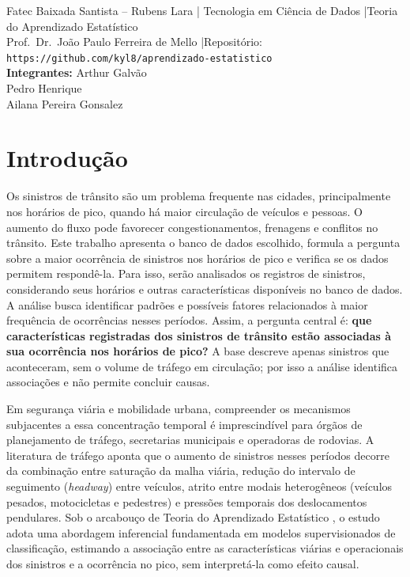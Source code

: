 \documentclass[
  article,
  12pt,
  oneside,
  a4paper,
  english,
  brazil
]{abntex2}\usepackage[]{graphicx}\usepackage[]{xcolor}
\newcommand{\nomecurso}{Tecnologia em Ciência de Dados}
\newcommand{\nomedisciplina}{Teoria do Aprendizado Estatístico}
\newcommand{\nomeprofessor}{Prof.\ Dr.\ João Paulo Ferreira de Mello}
\newcommand{\repositorio}{https://github.com/kyl8/aprendizado-estatistico}
\newcommand{\integrantes}{%
  Arthur Galvão \\
  Pedro Henrique \\
  Ailana Pereira Gonsalez%
}
\begin{document}
\frenchspacing

\maketitle

\begin{center}
  \footnotesize
  Fatec Baixada Santista -- Rubens Lara \quad|\quad
  \nomecurso{} \quad|\quad \nomedisciplina{} \\[0.2em]
  \nomeprofessor{} \quad|\quad Repositório: \texttt{\repositorio} \\[0.2em]
  \textbf{Integrantes:} \integrantes
\end{center}

\textual

\section{Introdução}

Os sinistros de trânsito são um problema frequente nas cidades, principalmente nos horários de pico, quando há maior circulação de veículos e pessoas. O aumento do fluxo pode favorecer congestionamentos, frenagens e conflitos no trânsito. Este trabalho apresenta o banco de dados escolhido, formula a pergunta sobre a maior ocorrência de sinistros nos horários de pico e verifica se os dados permitem respondê-la. Para isso, serão analisados os registros de sinistros, considerando seus horários e outras características disponíveis no banco de dados. A análise busca identificar padrões e possíveis fatores relacionados à maior frequência de ocorrências nesses períodos. Assim, a pergunta central é: \textbf{que características registradas dos sinistros de trânsito estão associadas à sua ocorrência nos horários de pico?} A base descreve apenas sinistros que aconteceram, sem o volume de tráfego em circulação; por isso a análise identifica associações e não permite concluir causas.

Em segurança viária e mobilidade urbana, compreender os mecanismos subjacentes a essa concentração temporal é imprescindível para órgãos de planejamento de tráfego, secretarias municipais e operadoras de rodovias. A literatura de tráfego aponta que o aumento de sinistros nesses períodos decorre da combinação entre saturação da malha viária, redução do intervalo de seguimento (\textit{headway}) entre veículos, atrito entre modais heterogêneos (veículos pesados, motocicletas e pedestres) e pressões temporais dos deslocamentos pendulares. Sob o arcabouço de Teoria do Aprendizado Estatístico \cite{james2021}, o estudo adota uma abordagem inferencial fundamentada em modelos supervisionados de classificação, estimando a associação entre as características viárias e operacionais dos sinistros e a ocorrência no pico, sem interpretá-la como efeito causal.
\end{document}
